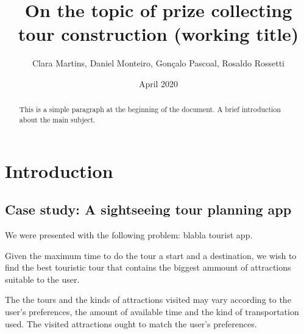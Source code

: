 \documentclass{article}
\title{On the topic of prize collecting tour construction (working title)}
\author{Clara Martins, Daniel Monteiro, Gonçalo Pascoal, Rosaldo Rossetti}
\date{April 2020}
\begin{document}
\maketitle

\begin{abstract}
This is a simple paragraph at the beginning of the 
document. A brief introduction about the main subject.
\end{abstract}

\section{Introduction}

\subsection{Case study: A sightseeing tour planning app}

We were presented with the following problem: blabla tourist app. 

Given the maximum time to do the tour a start and a destination, we wish to find the best touristic tour that contains the biggest ammount of attractions suitable to the user.

The the tours and the kinds of attractions visited may vary according to the user's preferences, the amount of available time and the kind of transportation used. The visited attractions ought to match the user's preferences.
\end{document}
